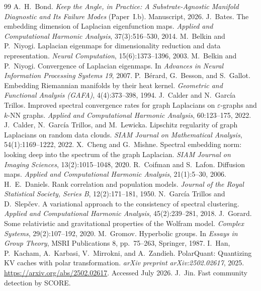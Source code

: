 \documentclass[11pt]{article}
\theoremstyle{remark}
\begin{document}
\begin{thebibliography}{99}
 A.~H.~Bond. \emph{Keep the Angle, in Practice: A
Substrate-Agnostic Manifold Diagnostic and Its Failure Modes} (Paper~I.b).
Manuscript, 2026.
 J.~Bates. The embedding dimension of Laplacian
eigenfunction maps. \emph{Applied and Computational Harmonic Analysis},
37(3):516--530, 2014.
 M.~Belkin and P.~Niyogi. Laplacian eigenmaps for
dimensionality reduction and data representation. \emph{Neural Computation},
15(6):1373--1396, 2003.
 M.~Belkin and P.~Niyogi. Convergence of Laplacian
eigenmaps. In \emph{Advances in Neural Information Processing Systems 19}, 2007.
 P.~B\'erard, G.~Besson, and S.~Gallot. Embedding
Riemannian manifolds by their heat kernel. \emph{Geometric and Functional
Analysis (GAFA)}, 4(4):373--398, 1994.
 J.~Calder and N.~Garc\'ia Trillos. Improved spectral
convergence rates for graph Laplacians on $\varepsilon$-graphs and $k$-NN graphs.
\emph{Applied and Computational Harmonic Analysis}, 60:123--175, 2022.
 J.~Calder, N.~Garc\'ia Trillos, and
M.~Lewicka. Lipschitz regularity of graph Laplacians on random data clouds.
\emph{SIAM Journal on Mathematical Analysis}, 54(1):1169--1222, 2022.
 X.~Cheng and G.~Mishne. Spectral embedding norm:
looking deep into the spectrum of the graph Laplacian. \emph{SIAM Journal on
Imaging Sciences}, 13(2):1015--1048, 2020.
 R.~Coifman and S.~Lafon. Diffusion maps. \emph{Applied and
Computational Harmonic Analysis}, 21(1):5--30, 2006.
 H.~E.~Daniels. Rank correlation and population
models. \emph{Journal of the Royal Statistical Society, Series B},
12(2):171--181, 1950.
 N.~Garc\'ia Trillos and D.~Slep\v{c}ev. A
variational approach to the consistency of spectral clustering. \emph{Applied
and Computational Harmonic Analysis}, 45(2):239--281, 2018.
 J.~Gorard. Some relativistic and gravitational properties of
the Wolfram model. \emph{Complex Systems}, 29(2):107--192, 2020.
 M.~Gromov. Hyperbolic groups. In \emph{Essays in Group
Theory}, MSRI Publications 8, pp.~75--263, Springer, 1987.
 I.~Han, P.~Kacham, A.~Karbasi, V.~Mirrokni, and
A.~Zandieh. PolarQuant: Quantizing KV caches with polar transformation.
\emph{arXiv preprint arXiv:2502.02617}, 2025.
\url{https://arxiv.org/abs/2502.02617}. Accessed July 2026.
 J.~Jin. Fast community detection by SCORE.

\end{thebibliography}
\end{document}
